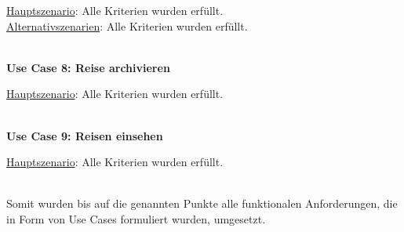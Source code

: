 \begin{addmargin}{10pt}
\underline{Hauptszenario}: Alle Kriterien wurden erfüllt.\\
\underline{Alternativszenarien}: Alle Kriterien wurden erfüllt.\\
\end{addmargin}
\\
\textbf{Use Case 8: Reise archivieren}\\

\begin{addmargin}{10pt}
\underline{Hauptszenario}: Alle Kriterien wurden erfüllt.\\
\end{addmargin}
\\
\textbf{Use Case 9: Reisen einsehen}\\

\begin{addmargin}{10pt}
\underline{Hauptszenario}: Alle Kriterien wurden erfüllt.\\
\end{addmargin}
\\
Somit wurden bis auf die genannten Punkte alle funktionalen Anforderungen, die in Form von Use Cases formuliert wurden, umgesetzt.







